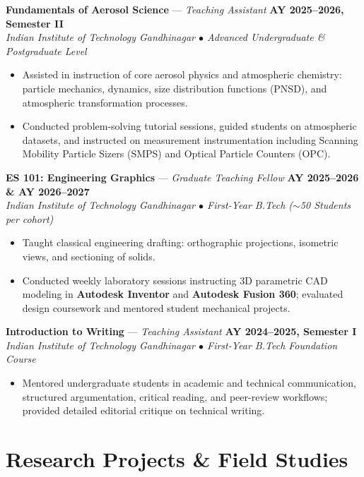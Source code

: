 \documentclass[10pt,a4paper]{article}
\begin{document}
\textbf{Fundamentals of Aerosol Science} --- \textit{Teaching Assistant} \hfill \textbf{AY 2025--2026, Semester II}\\
\textit{Indian Institute of Technology Gandhinagar $\bullet$ Advanced Undergraduate \& Postgraduate Level}
\begin{itemize}
    \item Assisted in instruction of core aerosol physics and atmospheric chemistry: particle mechanics, dynamics, size distribution functions (PNSD), and atmospheric transformation processes.
    \item Conducted problem-solving tutorial sessions, guided students on atmospheric datasets, and instructed on measurement instrumentation including Scanning Mobility Particle Sizers (SMPS) and Optical Particle Counters (OPC).
\end{itemize}

\vspace{3pt}
\textbf{ES 101: Engineering Graphics} --- \textit{Graduate Teaching Fellow} \hfill \textbf{AY 2025--2026 \& AY 2026--2027}\\
\textit{Indian Institute of Technology Gandhinagar $\bullet$ First-Year B.Tech ($\sim$50 Students per cohort)}
\begin{itemize}
    \item Taught classical engineering drafting: orthographic projections, isometric views, and sectioning of solids.
    \item Conducted weekly laboratory sessions instructing 3D parametric CAD modeling in \textbf{Autodesk Inventor} and \textbf{Autodesk Fusion 360}; evaluated design coursework and mentored student mechanical projects.
\end{itemize}

\vspace{3pt}
\textbf{Introduction to Writing} --- \textit{Teaching Assistant} \hfill \textbf{AY 2024--2025, Semester I}\\
\textit{Indian Institute of Technology Gandhinagar $\bullet$ First-Year B.Tech Foundation Course}
\begin{itemize}
    \item Mentored undergraduate students in academic and technical communication, structured argumentation, critical reading, and peer-review workflows; provided detailed editorial critique on technical writing.
\end{itemize}

\section*{Research Projects \& Field Studies}
\end{document}
